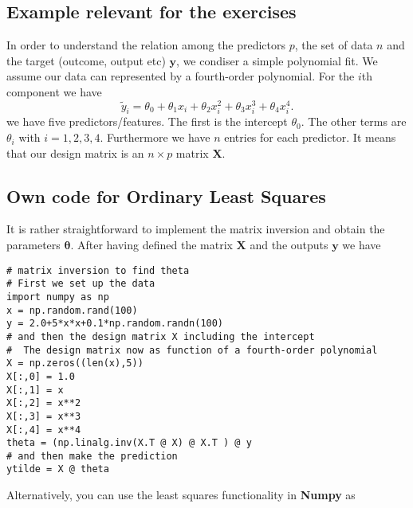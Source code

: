 \documentclass[%
oneside,                 %
final,                   %
10pt]{article}
\begin{document}
\subsection*{Example relevant for the exercises}

In order to understand the relation among the predictors $p$, the set of data $n$ and the target (outcome, output etc) $\bm{y}$,
we condiser a simple polynomial fit.
We assume our data can represented by a fourth-order polynomial. For the $i$th component we have 
\[
\tilde{y}_i = \theta_0+\theta_1x_i+\theta_2x_i^2+\theta_3x_i^3+\theta_4x_i^4.
\]
we have five predictors/features. The first is the intercept $\theta_0$. The other terms are $\theta_i$ with $i=1,2,3,4$. Furthermore we have $n$ entries for each predictor. It means that our design matrix is an 
$n\times p$ matrix $\bm{X}$.

\subsection*{Own code for Ordinary Least Squares}

It is rather straightforward to implement the matrix inversion and obtain the parameters $\bm{\theta}$. After having defined the matrix $\bm{X}$ and the outputs $\bm{y}$ we have 

















\begin{verbatim}
# matrix inversion to find theta
# First we set up the data
import numpy as np
x = np.random.rand(100)
y = 2.0+5*x*x+0.1*np.random.randn(100)
# and then the design matrix X including the intercept
#  The design matrix now as function of a fourth-order polynomial
X = np.zeros((len(x),5))
X[:,0] = 1.0
X[:,1] = x
X[:,2] = x**2
X[:,3] = x**3
X[:,4] = x**4
theta = (np.linalg.inv(X.T @ X) @ X.T ) @ y
# and then make the prediction
ytilde = X @ theta

\end{verbatim}

Alternatively, you can use the least squares functionality in \textbf{Numpy} as
\end{document}
